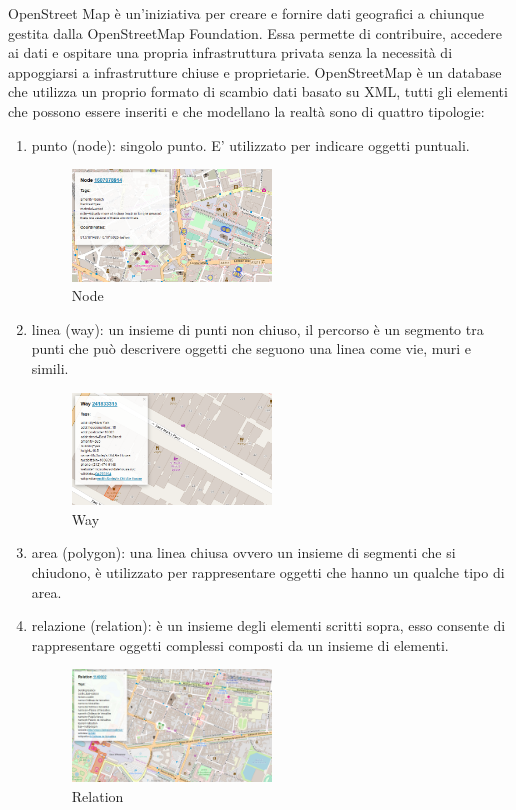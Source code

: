 OpenStreet Map\cite{OSM} è un'iniziativa per creare e fornire dati geografici a chiunque gestita dalla OpenStreetMap Foundation. Essa permette di contribuire, accedere ai dati e  ospitare una propria infrastruttura privata senza la necessità di appoggiarsi a infrastrutture chiuse e proprietarie.
OpenStreetMap è un database che utilizza un proprio formato di scambio dati basato su XML, tutti gli elementi che possono essere inseriti e che modellano la realtà sono di quattro tipologie: 
\begin{enumerate}
    \item punto (node): singolo punto. E' utilizzato per indicare oggetti puntuali.
    \begin{figure}[H]
    \centering
    \includegraphics[width=0.5\textwidth]{Immagini/nodes.png}
    \caption{Node}
    \label{fig:OSMNode}
\end{figure}

    \item linea (way): un insieme di punti non chiuso, il percorso è un segmento tra punti che può descrivere oggetti che seguono una linea come vie, muri e simili.
    \begin{figure}[H]
    \centering
    \includegraphics[width=0.5\textwidth]{Immagini/way.png}
    \caption{Way}
    \label{fig:OSMWay}
\end{figure}

    \item area (polygon): una linea chiusa ovvero un insieme di segmenti che si chiudono, è utilizzato per rappresentare oggetti che hanno un qualche tipo di area.
    \item relazione (relation): è un insieme degli elementi scritti sopra, esso consente di rappresentare oggetti complessi composti da un insieme di elementi.
    \begin{figure}[H]
    \centering
    \includegraphics[width=0.5\textwidth]{Immagini/relation.png}
    \caption{Relation}
    \label{fig:OSMPolygon}
\end{figure}

\end{enumerate}{}
